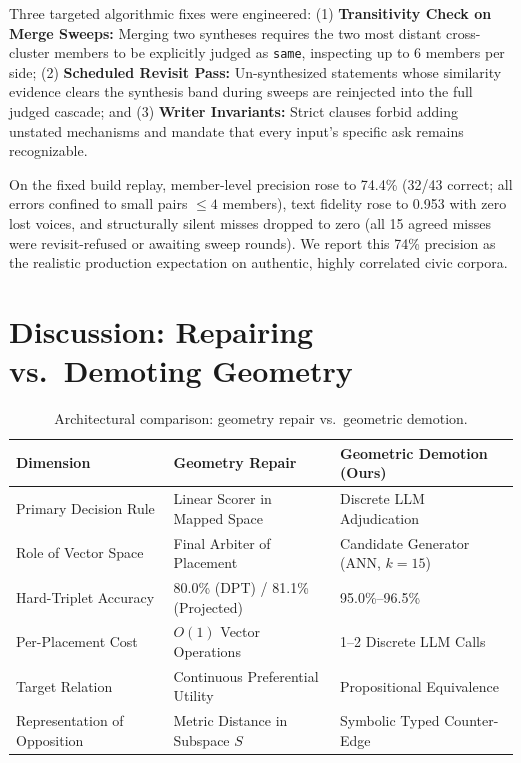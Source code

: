 \documentclass{article}
\begin{document}
Three targeted algorithmic fixes were engineered: (1) \textbf{Transitivity Check on Merge Sweeps:} Merging two syntheses requires the two most distant cross-cluster members to be explicitly judged as \texttt{same}, inspecting up to 6 members per side; (2) \textbf{Scheduled Revisit Pass:} Un-synthesized statements whose similarity evidence clears the synthesis band during sweeps are reinjected into the full judged cascade; and (3) \textbf{Writer Invariants:} Strict clauses forbid adding unstated mechanisms and mandate that every input's specific ask remains recognizable.

On the fixed build replay, member-level precision rose to 74.4\% (32/43 correct; all errors confined to small pairs $\leq 4$ members), text fidelity rose to 0.953 with zero lost voices, and structurally silent misses dropped to zero (all 15 agreed misses were revisit-refused or awaiting sweep rounds). We report this 74\% precision as the realistic production expectation on authentic, highly correlated civic corpora.

\section{Discussion: Repairing vs.\ Demoting Geometry}

\begin{table}[t]
\centering
\caption{Architectural comparison: geometry repair vs.\ geometric demotion.}
\label{tab:comparison}
\small
\begin{tabular}{@{}lll@{}}
\toprule
Dimension & Geometry Repair \citep{blair2026embeddings} & Geometric Demotion (Ours) \\
\midrule
Primary Decision Rule & Linear Scorer in Mapped Space & Discrete LLM Adjudication \\
Role of Vector Space & Final Arbiter of Placement & Candidate Generator (ANN, $k=15$) \\
Hard-Triplet Accuracy & 80.0\% (DPT) / 81.1\% (Projected) & 95.0\%--96.5\% \\
Per-Placement Cost & $O(1)$ Vector Operations & 1--2 Discrete LLM Calls \\
Target Relation & Continuous Preferential Utility & Propositional Equivalence \\
Representation of Opposition & Metric Distance in Subspace $S$ & Symbolic Typed Counter-Edge \\
\bottomrule
\end{tabular}
\end{table}
\end{document}
